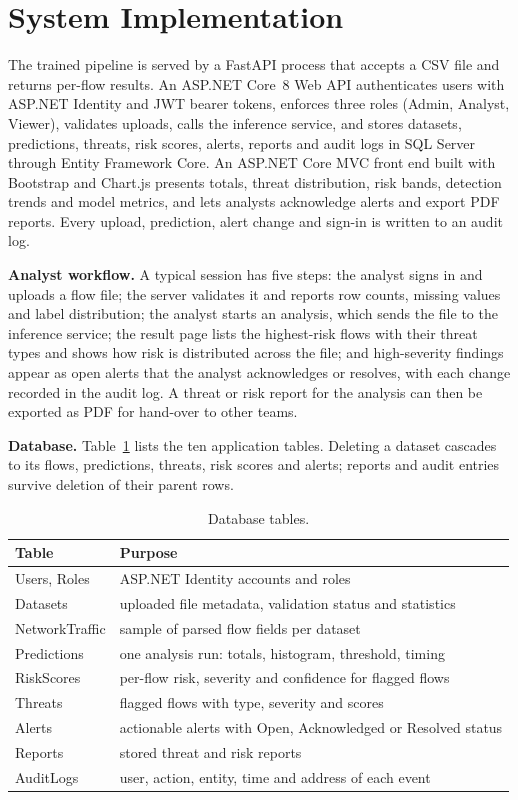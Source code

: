\documentclass[conference]{IEEEtran}
\begin{document}
\section{System Implementation}
The trained pipeline is served by a FastAPI process that accepts a CSV file and returns per-flow results. An ASP.NET Core~8 Web API authenticates users with ASP.NET Identity and JWT bearer tokens, enforces three roles (Admin, Analyst, Viewer), validates uploads, calls the inference service, and stores datasets, predictions, threats, risk scores, alerts, reports and audit logs in SQL Server through Entity Framework Core. An ASP.NET Core MVC front end built with Bootstrap and Chart.js presents totals, threat distribution, risk bands, detection trends and model metrics, and lets analysts acknowledge alerts and export PDF reports. Every upload, prediction, alert change and sign-in is written to an audit log.

\textbf{Analyst workflow.} A typical session has five steps: the analyst signs in and uploads a flow file; the server validates it and reports row counts, missing values and label distribution; the analyst starts an analysis, which sends the file to the inference service; the result page lists the highest-risk flows with their threat types and shows how risk is distributed across the file; and high-severity findings appear as open alerts that the analyst acknowledges or resolves, with each change recorded in the audit log. A threat or risk report for the analysis can then be exported as PDF for hand-over to other teams.

\textbf{Database.} Table~\ref{tab:db} lists the ten application tables. Deleting a dataset cascades to its flows, predictions, threats, risk scores and alerts; reports and audit entries survive deletion of their parent rows.

\begin{table}[!htb]
\caption{Database tables.}
\label{tab:db}
\centering\footnotesize
\begin{tabular}{@{}p{1.8cm}p{5.5cm}@{}}
\hline
Table & Purpose \\
\hline
Users, Roles & ASP.NET Identity accounts and roles \\
Datasets & uploaded file metadata, validation status and statistics \\
NetworkTraffic & sample of parsed flow fields per dataset \\
Predictions & one analysis run: totals, histogram, threshold, timing \\
RiskScores & per-flow risk, severity and confidence for flagged flows \\
Threats & flagged flows with type, severity and scores \\
Alerts & actionable alerts with Open, Acknowledged or Resolved status \\
Reports & stored threat and risk reports \\
AuditLogs & user, action, entity, time and address of each event \\
\hline
\end{tabular}
\end{table}
\end{document}
